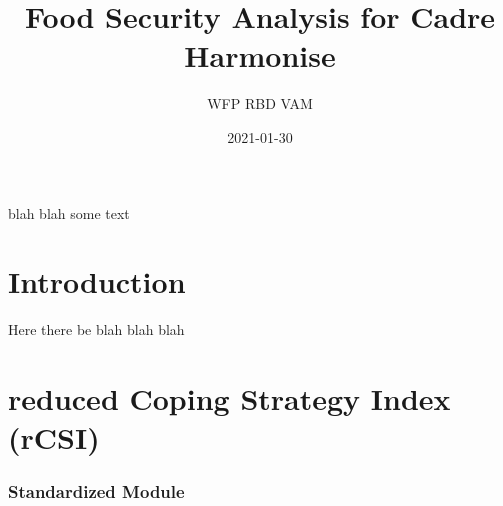 \documentclass[
]{article}
\title{Food Security Analysis for Cadre Harmonise}
\author{WFP RBD VAM}
\date{2021-01-30}
\begin{document}
\maketitle

{
\setcounter{tocdepth}{2}
\tableofcontents
}
blah blah some text

\hypertarget{introduction}{%
\section{Introduction}\label{introduction}}

Here there be blah blah blah

\hypertarget{reduced-coping-strategy-index-rcsi}{%
\section{reduced Coping Strategy Index (rCSI)}\label{reduced-coping-strategy-index-rcsi}}

\hypertarget{standardized-module}{%
\subsubsection{Standardized Module}\label{standardized-module}}
\end{document}
